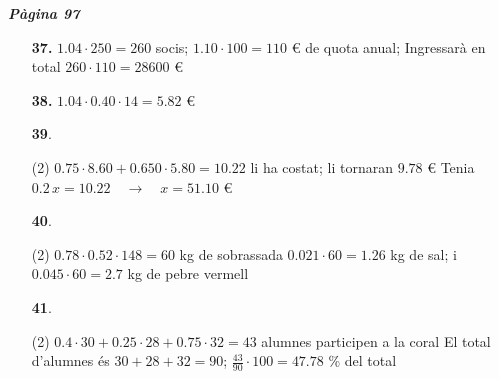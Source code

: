 \documentclass[a4paper, pdf, twoside]{book}
\begin{document}
\begin{multicols}{2}

{\textbf{\em Pàgina 97}} \hrulefill
\begin{enumerate}
\vspace{0.25cm}
\item[\fontfamily{phv}\selectfont\color{blue}\textbf{37. }] 
$1.04\cdot 250=260$ socis; $1.10\cdot 100 = 110$ \euro {} de quota anual; Ingressarà en total $260 \cdot 110 = 28600$ \euro {}
 \end{enumerate}
\begin{enumerate}
\vspace{0.25cm}
\item[\fontfamily{phv}\selectfont\color{blue}\textbf{38. }] 
$1.04 \cdot 0.40 \cdot 14= 5.82$ \euro {}
\vspace{0.25cm}



 \item[\fontfamily{phv}\selectfont\color{blue}\textbf{39}. ] 
 \begin{tasks}[column-sep=1em, item-indent=1.3333em](2)
	 \task* $0.75\cdot 8.60 + 0.650\cdot 5.80 = 10.22$ li ha costat; li tornaran $9.78$ \euro {}
	 \task* Tenia $0.2\,x = 10.22 \quad \rightarrow \quad x=51.10$ \euro {}
\end{tasks}
\vspace{0.25cm}



 \item[\fontfamily{phv}\selectfont\color{blue}\textbf{40}. ] 
 \begin{tasks}[column-sep=1em, item-indent=1.3333em](2)
	 \task* $0.78 \cdot 0.52 \cdot 148 = 60$ kg de sobrassada
	 \task* $0.021\cdot 60=1.26$ kg de sal; i $0.045\cdot 60=2.7$ kg de pebre vermell
\end{tasks}
\vspace{0.25cm}



 \item[\fontfamily{phv}\selectfont\color{blue}\textbf{41}. ] 
 \begin{tasks}[column-sep=1em, item-indent=1.3333em](2)
	 \task* $0.4\cdot 30 + 0.25\cdot 28 + 0.75 \cdot 32 = 43$ alumnes participen a la coral
	 \task* El total d'alumnes és $30+28+32=90$; $\frac {43}{90}\cdot 100=47.78$ \% del total
\end{tasks}
\vspace{0.25cm}



\end{enumerate}
\end{multicols}
\end{document}
